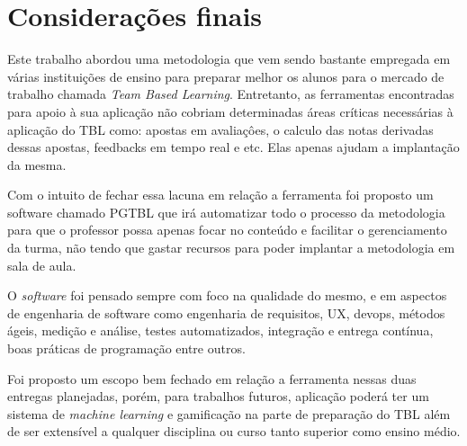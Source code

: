 \chapter{Considerações finais}

Este trabalho abordou uma metodologia que vem sendo bastante empregada em várias instituições de ensino para preparar melhor os alunos para o mercado de trabalho chamada \textit{Team Based Learning}. Entretanto, as ferramentas encontradas para apoio à sua aplicação não cobriam determinadas áreas críticas necessárias à aplicação do TBL como: apostas em avaliaçôes, o calculo das notas derivadas dessas apostas, feedbacks em tempo real e etc. Elas apenas ajudam a implantação da mesma.

Com o intuito de fechar essa lacuna em relação a ferramenta foi proposto um software chamado PGTBL que irá automatizar todo o processo da metodologia para que o professor possa apenas focar no conteúdo e facilitar o gerenciamento da turma, não tendo que gastar recursos para poder implantar a metodologia em sala de aula.

O \textit{software} foi pensado sempre com foco na qualidade do mesmo, e em aspectos de engenharia de software como engenharia de requisitos, UX, devops, métodos ágeis, medição e análise, testes automatizados, integração e entrega contínua, boas práticas de programação entre outros.

Foi proposto um escopo bem fechado em relação a ferramenta nessas duas entregas planejadas, porém, para trabalhos futuros, aplicação poderá ter um sistema de \textit{machine learning} e gamificação na parte de preparação do TBL além de ser extensível a qualquer disciplina ou curso tanto superior como ensino médio.
